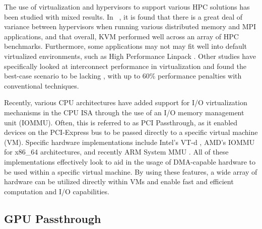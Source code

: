 \documentclass[10pt]{sigplanconf}
\begin{document}
The use of virtualization and hypervisors to support various HPC solutions has been studied with mixed results.  In ~\cite{Younge2011cloud}, it is found that there is a great deal of variance between hypervisors when running various distributed memory and MPI applications, and that overall, KVM performed well across an array of HPC benchmarks.  Furthermore, some applications may not may fit well into default virtualized environments, such as High Performance Linpack \cite{Luszczek:2011:EHC}. Other studies have specifically looked at interconnect performance in virtualization and found the best-case scenario to be lacking \cite{Ramakrishnan2012}, with up to 60\% performance penalties with conventional techniques.
 
Recently, various CPU architectures have added support for I/O virtualization mechanisms in the CPU ISA through the use of an I/O memory management unit (IOMMU). Often, this is referred to as PCI Passthrough, as it enabled devices on the PCI-Express bus to be passed directly to a specific virtual machine (VM).  Specific hardware implementations include Intel's VT-d \cite{intelvirtualization}, AMD's IOMMU \cite{amdiommu} for x86\_64 architectures, and recently ARM System MMU \cite{armmmu}.  All of these implementations effectively look to aid in the usage of DMA-capable hardware to be used within a specific virtual machine. By using these features, a wide array of hardware can be utilized directly within VMs and enable fast and efficient computation and I/O capabilities.



\subsection{GPU Passthrough}
\end{document}
